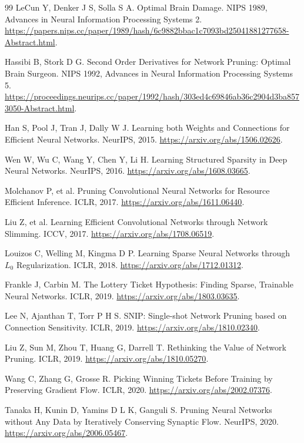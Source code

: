 \documentclass[UTF8,12pt,a4paper,fontset=fandol]{ctexart}
\begin{document}
\begin{thebibliography}{99}
LeCun Y, Denker J S, Solla S A. Optimal Brain Damage. NIPS 1989, Advances in Neural Information Processing Systems 2.
\url{https://papers.nips.cc/paper/1989/hash/6c9882bbac1c7093bd25041881277658-Abstract.html}.

Hassibi B, Stork D G. Second Order Derivatives for Network Pruning: Optimal Brain Surgeon. NIPS 1992, Advances in Neural Information Processing Systems 5.
\url{https://proceedings.neurips.cc/paper/1992/hash/303ed4c69846ab36c2904d3ba8573050-Abstract.html}.

Han S, Pool J, Tran J, Dally W J. Learning both Weights and Connections for Efficient Neural Networks. NeurIPS, 2015.
\url{https://arxiv.org/abs/1506.02626}.

Wen W, Wu C, Wang Y, Chen Y, Li H. Learning Structured Sparsity in Deep Neural Networks. NeurIPS, 2016.
\url{https://arxiv.org/abs/1608.03665}.

Molchanov P, et al. Pruning Convolutional Neural Networks for Resource Efficient Inference. ICLR, 2017.
\url{https://arxiv.org/abs/1611.06440}.

Liu Z, et al. Learning Efficient Convolutional Networks through Network Slimming. ICCV, 2017.
\url{https://arxiv.org/abs/1708.06519}.

Louizos C, Welling M, Kingma D P. Learning Sparse Neural Networks through $L_0$ Regularization. ICLR, 2018.
\url{https://arxiv.org/abs/1712.01312}.

Frankle J, Carbin M. The Lottery Ticket Hypothesis: Finding Sparse, Trainable Neural Networks. ICLR, 2019.
\url{https://arxiv.org/abs/1803.03635}.

Lee N, Ajanthan T, Torr P H S. SNIP: Single-shot Network Pruning based on Connection Sensitivity. ICLR, 2019.
\url{https://arxiv.org/abs/1810.02340}.

Liu Z, Sun M, Zhou T, Huang G, Darrell T. Rethinking the Value of Network Pruning. ICLR, 2019.
\url{https://arxiv.org/abs/1810.05270}.

Wang C, Zhang G, Grosse R. Picking Winning Tickets Before Training by Preserving Gradient Flow. ICLR, 2020.
\url{https://arxiv.org/abs/2002.07376}.

Tanaka H, Kunin D, Yamins D L K, Ganguli S. Pruning Neural Networks without Any Data by Iteratively Conserving Synaptic Flow. NeurIPS, 2020.
\url{https://arxiv.org/abs/2006.05467}.


\end{thebibliography}
\end{document}
